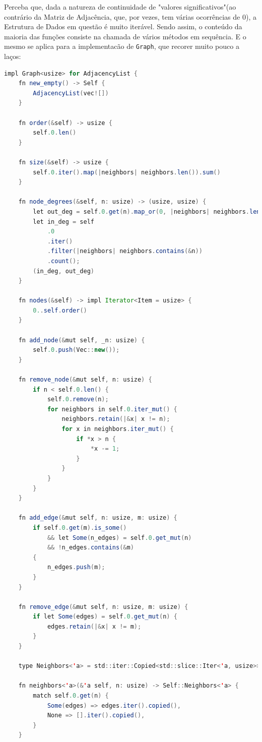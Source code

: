 Perceba que, dada a natureza de continuidade de "valores significativos"(ao contrário da Matriz de Adjacência, que, por vezes, tem várias ocorrências de 0), a Estrutura de Dados em questão é muito iterável. Sendo assim, o conteúdo da maioria das funções consiste na chamada de vários métodos em sequência. E o mesmo se aplica para a implementacão de \texttt{Graph}, que recorer muito pouco a laços:

\begin{lstlisting}[language=Java, caption={Implementação de Graph na Estrutura de Dados Matriz de Adjacência}, label=list:impl_adj_mat_g]
impl Graph<usize> for AdjacencyList {
    fn new_empty() -> Self {
        AdjacencyList(vec![])
    }

    fn order(&self) -> usize {
        self.0.len()
    }

    fn size(&self) -> usize {
        self.0.iter().map(|neighbors| neighbors.len()).sum()
    }

    fn node_degrees(&self, n: usize) -> (usize, usize) {
        let out_deg = self.0.get(n).map_or(0, |neighbors| neighbors.len());
        let in_deg = self
            .0
            .iter()
            .filter(|neighbors| neighbors.contains(&n))
            .count();
        (in_deg, out_deg)
    }

    fn nodes(&self) -> impl Iterator<Item = usize> {
        0..self.order()
    }

    fn add_node(&mut self, _n: usize) {
        self.0.push(Vec::new());
    }

    fn remove_node(&mut self, n: usize) {
        if n < self.0.len() {
            self.0.remove(n);
            for neighbors in self.0.iter_mut() {
                neighbors.retain(|&x| x != n);
                for x in neighbors.iter_mut() {
                    if *x > n {
                        *x -= 1;
                    }
                }
            }
        }
    }

    fn add_edge(&mut self, n: usize, m: usize) {
        if self.0.get(m).is_some()
            && let Some(n_edges) = self.0.get_mut(n)
            && !n_edges.contains(&m)
        {
            n_edges.push(m);
        }
    }

    fn remove_edge(&mut self, n: usize, m: usize) {
        if let Some(edges) = self.0.get_mut(n) {
            edges.retain(|&x| x != m);
        }
    }

    type Neighbors<'a> = std::iter::Copied<std::slice::Iter<'a, usize>>;

    fn neighbors<'a>(&'a self, n: usize) -> Self::Neighbors<'a> {
        match self.0.get(n) {
            Some(edges) => edges.iter().copied(),
            None => [].iter().copied(),
        }
    }


\end{lstlisting}
